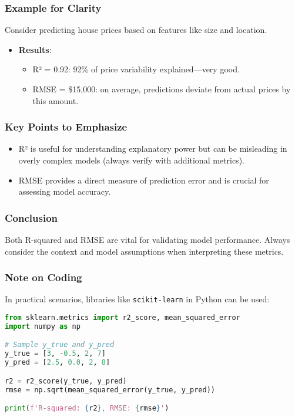 \documentclass[aspectratio=169]{beamer}
\begin{document}
\begin{frame}
    \frametitle{Example for Clarity}
    Consider predicting house prices based on features like size and location. 
    \begin{itemize}
        \item \textbf{Results}:
        \begin{itemize}
            \item R² = 0.92: 92\% of price variability explained—very good.
            \item RMSE = \$15,000: on average, predictions deviate from actual prices by this amount.
        \end{itemize}
    \end{itemize}
\end{frame}

\begin{frame}
    \frametitle{Key Points to Emphasize}
    \begin{itemize}
        \item R² is useful for understanding explanatory power but can be misleading in overly complex models (always verify with additional metrics).
        \item RMSE provides a direct measure of prediction error and is crucial for assessing model accuracy.
    \end{itemize}
\end{frame}

\begin{frame}[fragile]
    \frametitle{Conclusion}
    Both R-squared and RMSE are vital for validating model performance. Always consider the context and model assumptions when interpreting these metrics.
\end{frame}

\begin{frame}[fragile]
    \frametitle{Note on Coding}
    In practical scenarios, libraries like \texttt{scikit-learn} in Python can be used:
    \begin{lstlisting}[language=Python]
from sklearn.metrics import r2_score, mean_squared_error
import numpy as np

# Sample y_true and y_pred
y_true = [3, -0.5, 2, 7]
y_pred = [2.5, 0.0, 2, 8]

r2 = r2_score(y_true, y_pred)
rmse = np.sqrt(mean_squared_error(y_true, y_pred))

print(f'R-squared: {r2}, RMSE: {rmse}')
    \end{lstlisting}
\end{frame}
\end{document}
